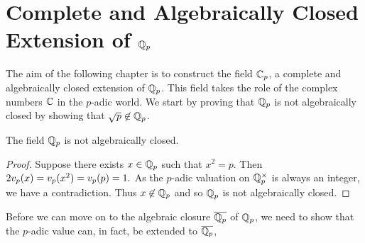 \chapter{Complete and Algebraically Closed Extension of $\mathbb{Q}_p$}
The aim of the following chapter is to construct the field $\mathbb{C}_p$, a complete and algebraically closed extension of $\mathbb{Q}_p$. This field takes the role of the complex numbers $\mathbb{C}$ in the $p$-adic world. We start by proving that $\mathbb{Q}_p$ is not algebraically closed by showing that $\sqrt{p}\not\in\mathbb{Q}_p$.
\begin{prop}
    The field $\mathbb{Q}_p$ is not algebraically closed.
\end{prop}
\begin{proof}
    Suppose there exists $x\in\mathbb{Q}_p$ such that $x^2=p$. Then
    $2v_p{(x)}=v_p{(x^2)}=v_p{(p)}=1.$
    As the $p$-adic valuation on $\mathbb{Q}_p^\times$ is always an integer, we have a contradiction. Thus $x\not\in\mathbb{Q}_p$ and so $\mathbb{Q}_p$ is not algebraically closed.
\end{proof}
Before we can move on to the algebraic closure $\overline{\mathbb{Q}_p}$ of $\mathbb{Q}_p$, we need to show that the $p$-adic value can, in fact, be extended to $\overline{\mathbb{Q}_p}$, 
